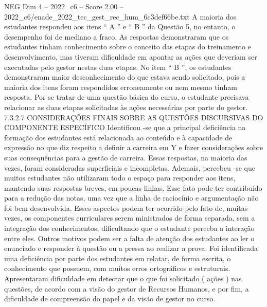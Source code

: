 \begin{textsample}{NEG Dim 4 – 2022\_c6 – Score 2.00 – 2022\_c6/enade\_2022\_tec\_gest\_rec\_hum\_6c3def66be.txt}
A maioria dos estudantes respondeu aos itens “ A ” e “ B ” da Questão 5, no entanto, o desempenho foi de mediano a fraco.
As respostas demonstraram que os estudantes tinham conhecimento sobre o conceito das etapas do treinamento e desenvolvimento, mas tiveram dificuldade em apontar as ações que deveriam ser executadas pelo gestor nestas duas etapas.
No item “ B ”, os estudantes demonstraram maior desconhecimento do que estava sendo solicitado, pois a maioria dos itens foram respondidos erroneamente ou nem mesmo tinham resposta.
Por se tratar de uma questão básica do curso, o estudante precisava relacionar as duas etapas solicitadas às ações necessárias por parte do gestor. 7.3.2.7 CONSIDERAÇÕES FINAIS SOBRE AS QUESTÕES DISCURSIVAS DO COMPONENTE ESPECÍFICO Identificou -se que a principal deficiência na formação dos estudantes está relacionada ao conteúdo e à capacidade de expressão no que diz respeito a definir a carreira em Y e fazer considerações sobre suas consequências para a gestão de carreira.
Essas respostas, na maioria das vezes, foram consideradas superficiais e incompletas.
Ademais, percebeu -se que muitos estudantes não utilizaram todo o espaço para responder aos itens, mantendo suas respostas breves, em poucas linhas.
Esse fato pode ter contribuído para a redução das notas, uma vez que a linha de raciocínio e argumentação não foi bem desenvolvida.
Esses aspectos podem ter ocorrido pelo fato de, muitas vezes, os componentes curriculares serem ministrados de forma separada, sem a integração dos conhecimentos, dificultando que o estudante perceba a interação entre eles.
Outros motivos podem ser a falta de atenção dos estudantes ao ler o enunciado e responder à questão ou a pressa ao realizar a prova.
Foi identificada uma deficiência por parte dos estudantes em relatar, de forma escrita, o conhecimento que possuem, com muitos erros ortográficos e estruturais.
Apresentaram dificuldade em detectar que o que foi solicitado ( ações ) nas questões, de acordo com a visão do gestor de Recursos Humanos, e por fim, a dificuldade de compreensão do papel e da visão de gestor no curso.

\end{textsample}
